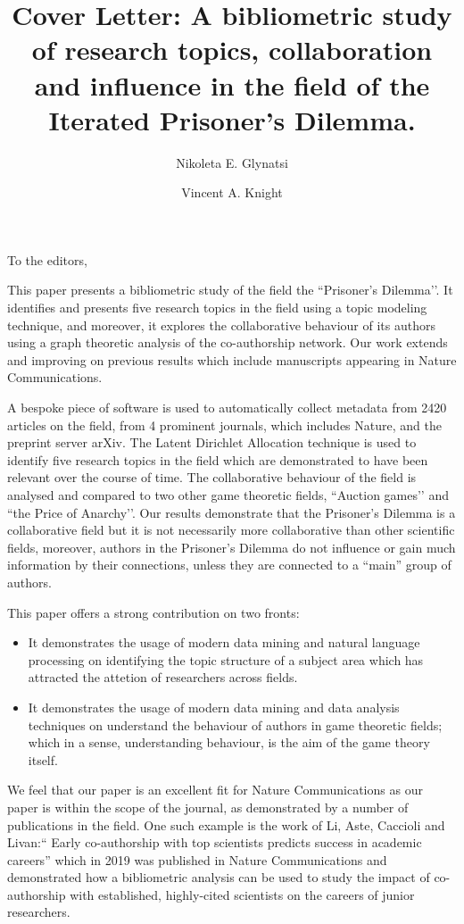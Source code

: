 \documentclass{article}
\title{Cover Letter: A bibliometric study of research topics, collaboration and
influence in the field of the Iterated Prisoner’s Dilemma.}
\author[1]{Nikoleta E. Glynatsi}
\author[1]{Vincent A. Knight}
\affil[1]{Cardiff University, School of Mathematics, Cardiff, United Kingdom}
\date{}
\begin{document}
\maketitle

To the editors,

This paper presents a bibliometric study of the field the ``Prisoner’s
Dilemma’’. It identifies and presents five research topics in the field using a
topic modeling technique, and moreover, it explores the collaborative behaviour
of its authors using a graph theoretic analysis of the co-authorship network.
Our work extends and improving on previous results which include
manuscripts appearing in Nature Communications.

A bespoke piece of software is used to automatically collect metadata from 2420
articles on the field, from 4 prominent journals, which includes Nature, and the
preprint server arXiv. The Latent Dirichlet Allocation technique is used to
identify five research topics in the field which are demonstrated to have been
relevant over the course of time. The collaborative behaviour of the field is
analysed and compared to two other game theoretic fields, ``Auction games’’ and
``the Price of Anarchy’’. Our results demonstrate that the Prisoner's Dilemma is
a collaborative field but it is not necessarily more collaborative than other
scientific fields, moreover, authors in the Prisoner’s Dilemma do not influence
or gain much information by their connections, unless they are connected to a
``main” group of authors.

This paper offers a strong contribution on two fronts:

\begin{itemize}
    \item It demonstrates the usage of modern data mining and natural language
    processing on identifying the topic structure of a subject area which has
    attracted the attetion of researchers across fields.
    \item It demonstrates the usage of modern data mining and data analysis
    techniques on understand the behaviour of authors in game theoretic
    fields; which in a sense, understanding behaviour, is the aim of the game
    theory itself.
\end{itemize}

We feel that our paper is an excellent fit for Nature Communications as our
paper is within the scope of the journal, as demonstrated by a number of
publications in the field. One such example is the work of Li, Aste, Caccioli
and Livan:`` Early co-authorship with top scientists predicts success
in academic careers'' which in 2019 was published in Nature Communications and
demonstrated how a bibliometric analysis can be used to study the impact of
co-authorship with established, highly-cited scientists on the careers of junior
researchers.
\end{document}
